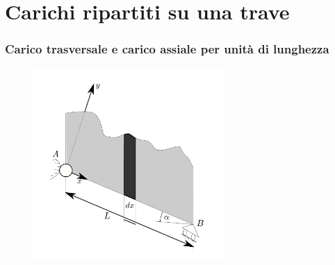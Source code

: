 \clearpage
\pagestyle{fancy}
\part{Carichi ripartiti su una trave}
\setcounter{section}{0}
\section{Carico trasversale e carico assiale per unità di lunghezza}
\renewcommand{\thefigure}{10~-~1}
\begin{figure}[ht]
\centering
\includegraphics[width=0.65\textwidth]{Immagini/Parte_10/Figura10_1/figura10_1.pdf}
\caption{}
\label{figura10-1}
\end{figure}
